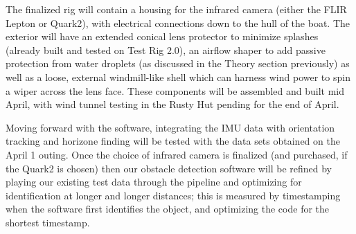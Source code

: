 The finalized rig will contain a housing for the infrared camera (either the FLIR Lepton or Quark2), with electrical connections down to the hull of the boat. The exterior will have an extended conical lens protector to minimize splashes (already built and tested on Test Rig 2.0), an airflow shaper to add passive protection from water droplets (as discussed in the Theory section previously) as well as a loose, external windmill-like shell which can harness wind power to spin a wiper across the lens face. These components will be assembled and built mid April, with wind tunnel testing in the Rusty Hut pending for the end of April.

Moving forward with the software, integrating the IMU data with orientation tracking and horizone finding will be tested with the data sets obtained on the April 1 outing. Once the choice of infrared camera is finalized (and purchased, if the Quark2 is chosen) then our obstacle detection software will be refined by playing our existing test data through the pipeline and optimizing for identification at longer and longer distances; this is measured by timestamping when the software first identifies the object, and optimizing the code for the shortest timestamp.
